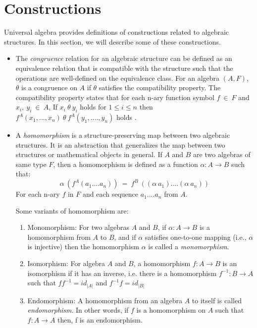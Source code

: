 \section{Constructions}
\label{construct}
Universal algebra provides definitions of constructions related to algebraic
structures. In this section, we will describe some of these constructions. 
\begin{itemize}
    \item The \textit{congruence} relation for an algebraic structure can be
    defined as an equivalence relation that is compatible with the structure
    such that the operations are well-defined on the equivalence class. For an
    algebra $(A,F)$, $\theta$ is a congruence on $A$ if $\theta$ satisfies the
    compatibility property. The compatibility property states that for each
    n-ary function symbol $f \ \in\ F$ and $x_i,\ y_i\ \in\ A$, If $x_i\ \theta\
    y_i$ holds for \(1\leq i \leq n\) then $f^{A}(x_1,...,x_n)\ \theta\
    f^{A}(y_1,....,y_n)$ holds \cite{sankappanavar1981course}.
    
    \item A \textit{homomorphism} is a structure-preserving map between two
    algebraic structures. It is an abstraction that generalizes the map between
    two structures or mathematical objects in general. If $A$ and $B$ are two
    algebras of same type $F$, then a homomorphism is defined as a function
    $\alpha: A \rightarrow B$ such that: \[ \alpha\ (f^{A}(a_1....a_n))\ =\
    f^{B}\ ((\alpha\ a_1)....(\alpha\ a_n))\] For each n-ary $f$ in $F$ and each
    sequence $a_1....a_n$ from $A$.

    Some variants of homomorphism are:
    \begin{enumerate}
        \item  Monomorphism: For two algebras $A$ and $B$, if \(\alpha : A
        \rightarrow B \) is a homomorphism from $A$ to $B$, and if \(\alpha\)
        satisfies one-to-one mapping (i.e., \(\alpha\) is injective) then the
        homomorphism \(\alpha\) is called a \textit{monomorphism}.

        \item Isomorphism: For algebra $A$ and $B$, a homomorphism $f:A → B$ is
        an isomorphism if it has an inverse, i.e. there is a homomorphism
        $f^{-1}:B → A$ such that $ff^{-1} =
        id_{|A|}$ and $f^{-1}f = id_{|B|}$ 

        \item Endomorphism: A homomorphism from an algebra $A$ to itself is
        called \textit{endomorphism}. In other words, if $f$ is a homomorphism on $A$
        such that $f: A \rightarrow A$ then, f is an endomorphism.


\end{enumerate}
\end{itemize}
